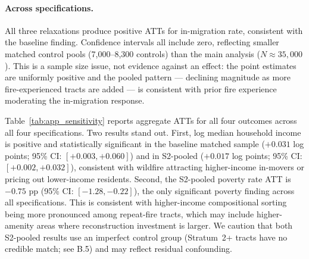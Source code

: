 \documentclass[12pt]{article}
\begin{document}
\paragraph{Across specifications.}
All three relaxations produce positive ATTs for in-migration rate, consistent with
the baseline finding.
Confidence intervals all include zero, reflecting smaller matched control pools
(7,000--8,300 controls) than the main analysis ($N \approx 35{,}000$).
This is a sample size issue, not evidence against an effect: the point estimates
are uniformly positive and the pooled pattern --- declining magnitude as more
fire-experienced tracts are added --- is consistent with prior fire experience
moderating the in-migration response.

Table~\ref{tab:app_sensitivity} reports aggregate ATTs for all four outcomes across
all four specifications.
Two results stand out.
First, log median household income is positive and statistically significant in the
baseline matched sample ($+0.031$ log points; 95\% CI: $[+0.003, +0.060]$) and in
S2-pooled ($+0.017$ log points; 95\% CI: $[+0.002, +0.032]$), consistent with
wildfire attracting higher-income in-movers or pricing out lower-income residents.
Second, the S2-pooled poverty rate ATT is $-0.75$ pp (95\% CI: $[-1.28, -0.22]$),
the only significant poverty finding across all specifications.
This is consistent with higher-income compositional sorting being more pronounced
among repeat-fire tracts, which may include higher-amenity areas where reconstruction
investment is larger.
We caution that both S2-pooled results use an imperfect control group (Stratum~2+
tracts have no credible match; see B.5) and may reflect residual confounding.
\end{document}
